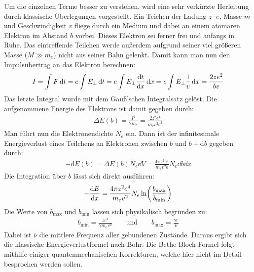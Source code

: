 Um die einzelnen Terme besser zu verstehen, wird eine sehr verkürzte Herleitung durch klassische Überlegungen vorgestellt.
Ein Teichen der Ladung $z\cdot e$, Masse $m$ und Geschwindigkeit $v$ fliege durch ein Medium und dabei an einem atomaren Elektron im Abstand $b$ vorbei.
Dieses Elektron sei ferner frei und anfangs in Ruhe.
Das eintreffende Teilchen werde außerdem aufgrund seiner viel größeren Masse ($M\gg m_e$) nicht aus seiner Bahn gelenkt.
Damit kann man nun den Impulsübertrag an das Elektron berechnen:
\begin{align*}
	I=\int F \dd{t}=e\int E_\perp \dd{t}=e\int E_\perp \dv{t}{x} \dd{x}=e\int E_\perp \frac{1}{v} \dd{x}=\frac{2ze^2}{bv}
\end{align*}
Das letzte Integral wurde mit dem Gauß'schen Integralsatz gelöst.
Die aufgenommene Energie des Elektrons ist damit gegeben durch:
\begin{align*}
	\Delta E(b)=\frac{I^2}{2m_e}=\frac{2z^2e^4}{m_e v^2b^2}
\end{align*}
Man führt nun die Elektronendichte $N_e$ ein.
Dann ist der infinitesimale Energieverlust eines Teilchens an Elektronen zwischen $b$ und $b+\text{d}b$ gegeben durch:
\begin{align*}
	-\text{d}E(b)=\Delta E(b)N_e \dd{V}= \frac{4\pi z^2e^4}{m_e v^2b}N_e \dd{b} \dd{x}
\end{align*}
Die Integration über $b$ lässt sich direkt ausführen:
\begin{align*}
	-\dv{E}{x}=\frac{4\pi z^2e^4}{m_e v^2}N_e\ln(\frac{b_\text{max}}{b_\text{min}})
\end{align*}
Die Werte von $b_\text{max}$ und $b_\text{min}$ lassen sich physikalisch begründen zu:
\begin{align*}
	b_\text{min}= \frac{ze^2}{\gamma m_e v^2}\qquad\text{und}\qquad b_\text{max}=\frac{\gamma v}{\bar{\nu}}
\end{align*}
Dabei ist $\bar{\nu}$ die mittlere Frequenz aller gebundenen Zustände.
Daraus ergibt sich die klassische Energieverlustformel nach Bohr.
Die Bethe-Bloch-Formel folgt mithilfe einiger quantenmechanischen Korrekturen, welche hier nicht im Detail besprochen werden sollen.

